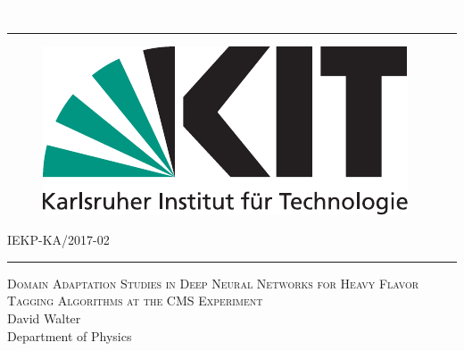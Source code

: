 \begin{titlepage}
  \begin{addmargin}[1.5cm]{0cm}
    \thispagestyle{empty}
    \vspace{-1cm}
    \begin{center}
                \textcolor{white}{´}\vspace{-3.5cm}
                  \rule{\linewidth}{0.75pt}
                    \vspace{-0.15cm}


\begin{figure}[htbp]
  \centering
  \hspace{26pt}
  \includegraphics[scale=0.5]{LogoKit}
\end{figure}

      \vspace{-0.45cm}
\hspace{9cm}IEKP-KA/2017-02
\rule{\linewidth}{0.75pt}

\vspace{0.8cm}


\Large{\textsc{Domain Adaptation Studies in Deep Neural Networks for Heavy Flavor Tagging Algorithms at the CMS Experiment}}\\
\vspace{0.9cm}
\Large{David Walter}\\
\vspace{0.9cm}
\vspace{1cm}
\large{Department of Physics\\
  
}
\end{center}
\end{addmargin}
\end{titlepage}
